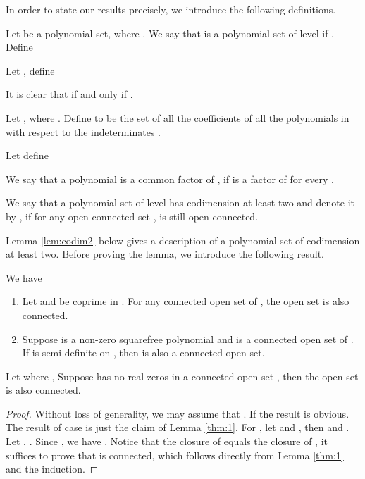 \documentclass[amsthm]{elsart}
\begin{document}
In order to state our results precisely, we introduce the following definitions.


\begin{defn}
Let  be a polynomial set, where . We say that  is a polynomial set of level  if . Define

Let , define

It is clear that  if and only if .

Let , where . Define
 to be the set of all the coefficients of all the polynomials  in  with respect to the indeterminates .

Let  define

We say that a polynomial  is a common factor of , if  is a factor of  for every .

We say that a polynomial set  of level  has codimension at least two and denote it by , if for any open connected set ,  is still open connected.
\end{defn}
Lemma \ref{lem:codim2} below gives a description of a polynomial set of codimension at least two. Before proving the lemma, we introduce the following result.

\begin{lem}\label{thm:1} \citep{han2016proving}
We have
\begin{enumerate}
\item Let  and  be coprime in . For any connected open set  of , the open set  is also connected.

\item Suppose  is a non-zero squarefree polynomial and  is a connected open set of . If  is semi-definite on , then  is also a connected open set.
\end{enumerate}
\end{lem}

\begin{lem}\label{lem:connected} Let  where ,  Suppose  has no real zeros in a connected open set , then the open set  is also connected.
\end{lem}
\begin{proof}
Without loss of generality, we may assume that . If  the result is obvious. The result of case  is just the claim of Lemma \ref{thm:1}. For , let  and  , then  and . Let , .
Since , we have . Notice that the closure of  equals the closure of , it suffices to prove that  is connected, which follows directly from Lemma \ref{thm:1} and the induction.
\end{proof}
\end{document}
